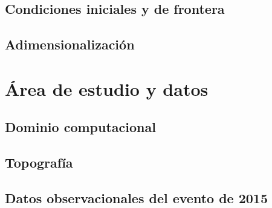 \subsection{Condiciones iniciales y de frontera}

\subsection{Adimensionalización}


\section{Área de estudio y datos}
\label{sec:datos}

\subsection{Dominio computacional}

\subsection{Topografía}

\subsection{Datos observacionales del evento de 2015}

